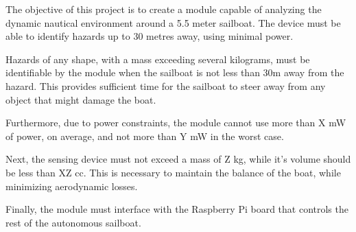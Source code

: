 The objective of this project is to create a module capable of analyzing the dynamic nautical environment around a 5.5 meter sailboat. The device must be able to identify hazards up to 30 metres away, using minimal power.

Hazards of any shape, with a mass exceeding several kilograms, must be identifiable by the module when the sailboat is not less than 30m away from the hazard. This provides sufficient time for the sailboat to steer away from any object that might damage the boat.

Furthermore, due to power constraints, the module cannot use more than X mW of power, on average, and not more than Y mW in the worst case.

Next, the sensing device must not exceed a mass of Z kg, while it's volume should be less than XZ cc. This is necessary to maintain the balance of the boat, while minimizing aerodynamic losses.

Finally, the module must interface with the Raspberry Pi board that controls the rest of the autonomous sailboat.